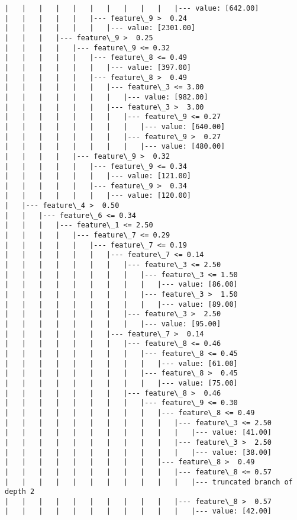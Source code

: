 \documentclass[11pt]{article}
\begin{document}
\begin{Verbatim}[commandchars=\\\{\}]
|   |   |   |   |   |   |   |   |   |   |--- value: [642.00]
|   |   |   |   |   |--- feature\_9 >  0.24
|   |   |   |   |   |   |--- value: [2301.00]
|   |   |   |--- feature\_9 >  0.25
|   |   |   |   |--- feature\_9 <= 0.32
|   |   |   |   |   |--- feature\_8 <= 0.49
|   |   |   |   |   |   |--- value: [397.00]
|   |   |   |   |   |--- feature\_8 >  0.49
|   |   |   |   |   |   |--- feature\_3 <= 3.00
|   |   |   |   |   |   |   |--- value: [982.00]
|   |   |   |   |   |   |--- feature\_3 >  3.00
|   |   |   |   |   |   |   |--- feature\_9 <= 0.27
|   |   |   |   |   |   |   |   |--- value: [640.00]
|   |   |   |   |   |   |   |--- feature\_9 >  0.27
|   |   |   |   |   |   |   |   |--- value: [480.00]
|   |   |   |   |--- feature\_9 >  0.32
|   |   |   |   |   |--- feature\_9 <= 0.34
|   |   |   |   |   |   |--- value: [121.00]
|   |   |   |   |   |--- feature\_9 >  0.34
|   |   |   |   |   |   |--- value: [120.00]
|   |--- feature\_4 >  0.50
|   |   |--- feature\_6 <= 0.34
|   |   |   |--- feature\_1 <= 2.50
|   |   |   |   |--- feature\_7 <= 0.29
|   |   |   |   |   |--- feature\_7 <= 0.19
|   |   |   |   |   |   |--- feature\_7 <= 0.14
|   |   |   |   |   |   |   |--- feature\_3 <= 2.50
|   |   |   |   |   |   |   |   |--- feature\_3 <= 1.50
|   |   |   |   |   |   |   |   |   |--- value: [86.00]
|   |   |   |   |   |   |   |   |--- feature\_3 >  1.50
|   |   |   |   |   |   |   |   |   |--- value: [89.00]
|   |   |   |   |   |   |   |--- feature\_3 >  2.50
|   |   |   |   |   |   |   |   |--- value: [95.00]
|   |   |   |   |   |   |--- feature\_7 >  0.14
|   |   |   |   |   |   |   |--- feature\_8 <= 0.46
|   |   |   |   |   |   |   |   |--- feature\_8 <= 0.45
|   |   |   |   |   |   |   |   |   |--- value: [61.00]
|   |   |   |   |   |   |   |   |--- feature\_8 >  0.45
|   |   |   |   |   |   |   |   |   |--- value: [75.00]
|   |   |   |   |   |   |   |--- feature\_8 >  0.46
|   |   |   |   |   |   |   |   |--- feature\_9 <= 0.30
|   |   |   |   |   |   |   |   |   |--- feature\_8 <= 0.49
|   |   |   |   |   |   |   |   |   |   |--- feature\_3 <= 2.50
|   |   |   |   |   |   |   |   |   |   |   |--- value: [41.00]
|   |   |   |   |   |   |   |   |   |   |--- feature\_3 >  2.50
|   |   |   |   |   |   |   |   |   |   |   |--- value: [38.00]
|   |   |   |   |   |   |   |   |   |--- feature\_8 >  0.49
|   |   |   |   |   |   |   |   |   |   |--- feature\_8 <= 0.57
|   |   |   |   |   |   |   |   |   |   |   |--- truncated branch of depth 2
|   |   |   |   |   |   |   |   |   |   |--- feature\_8 >  0.57
|   |   |   |   |   |   |   |   |   |   |   |--- value: [42.00]

\end{Verbatim}
\end{document}
